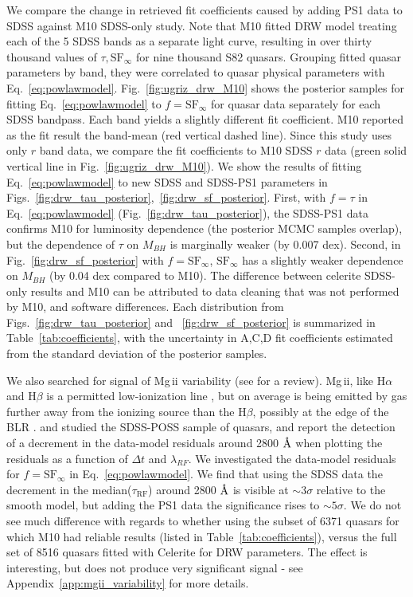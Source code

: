 \documentclass[twocolumn]{aastex62}
\let\oldAA\AA
\renewcommand{\AA}{\text{\normalfont\oldAA}}
\newcommand{\project}[1]{\textsf{#1}}
\begin{document}
We compare the change in retrieved fit coefficients caused by adding PS1 data to SDSS against M10 SDSS-only study. Note that M10 fitted  DRW model treating each of the 5 SDSS bands as a separate light curve, resulting in over thirty thousand values of $\tau, \mathrm{SF}_{\infty}$ for nine thousand S82 quasars. Grouping fitted quasar parameters by band, they were correlated to quasar physical parameters with Eq.~\ref{eq:powlawmodel}. Fig.~\ref{fig:ugriz_drw_M10} shows the posterior samples for fitting  Eq.~\ref{eq:powlawmodel} to $f=\mathrm{SF}_{\infty}$ for quasar data separately for each SDSS bandpass.  Each band yields a slightly different fit coefficient. M10 reported as the fit result the band-mean (red vertical dashed line). Since this study uses only $r$ band data, we compare the fit coefficients to M10 SDSS $r$ data (green solid vertical line in Fig.~\ref{fig:ugriz_drw_M10}). We show the results of fitting Eq.~\ref{eq:powlawmodel} to new SDSS and SDSS-PS1 parameters in Figs.~\ref{fig:drw_tau_posterior},~\ref{fig:drw_sf_posterior}. First, with $f=\tau$ in Eq.~\ref{eq:powlawmodel} (Fig.~\ref{fig:drw_tau_posterior}), the SDSS-PS1 data confirms M10 for luminosity dependence (the posterior MCMC samples overlap), but the dependence of $\tau$  on $M_{BH}$  is marginally weaker (by 0.007 dex). Second, in Fig.~\ref{fig:drw_sf_posterior} with  $f=\mathrm{SF}_{\infty}$, $\mathrm{SF}_{\infty}$ has a slightly weaker dependence on $M_{BH}$ (by 0.04 dex compared to M10). The difference between \project{celerite} SDSS-only results and M10 can be attributed to data cleaning that was not performed by M10, and software differences. Each distribution from 
Figs.~\ref{fig:drw_tau_posterior} and ~\ref{fig:drw_sf_posterior} is summarized in Table~\ref{tab:coefficients}, with the uncertainty in A,C,D fit coefficients estimated from  the standard deviation of the posterior samples. 

We also searched for signal of Mg\,{\sc ii} variability (see \citealt{cackett2015} for a review). Mg\,{\sc ii}, like  H$\alpha$  and  H$\beta$  is a permitted low-ionization line \citep{yang2019}, but on average is being emitted by gas further away from the ionizing source than the  H$\beta$, possibly at the edge of the BLR \citep{guo2019}. \cite{ivezic2004} and \cite{macleod2012} studied the SDSS-POSS sample of quasars, and report the detection of a decrement in the data-model residuals around 2800 $\mbox{\AA}$ when plotting the residuals as a function of $\Delta t$ and $\lambda_{RF}$. We investigated the data-model residuals for $f=\mathrm{SF}_{\infty}$ in Eq.~\ref{eq:powlawmodel}. We find that using the SDSS data the decrement in the median($\tau_{\mathrm{RF}}$) around 2800 $\mbox{\AA}$ is visible at $\sim 3 \sigma$  relative to the smooth model, but adding the PS1 data the significance rises to $\sim 5 \sigma$. We do not see much difference with regards to whether using the subset of 6371 quasars for which M10 had reliable results (listed in Table~\ref{tab:coefficients}), versus  the full set of 8516 quasars fitted with Celerite for DRW parameters. The effect is interesting, but does not produce very significant signal - see Appendix~\ref{app:mgii_variability} for more details. 
\end{document}
